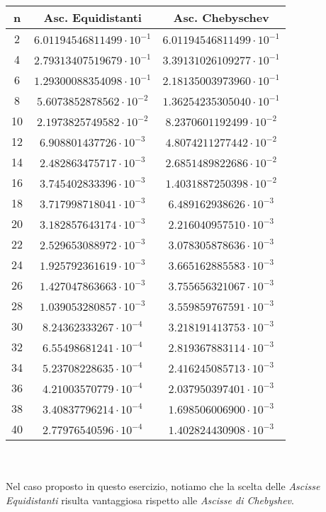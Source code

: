 \begin{tabular}{|c|c|c|}	%
	\hline
	n&Asc. Equidistanti&Asc. Chebyschev\\ \hline
	 2&$ 6.01194546811499 \cdot 10^{-1}   $&$ 6.01194546811499 \cdot 10^{-1} $\\ \hline
4&$ 2.79313407519679 \cdot 10^{-1}   $&$ 3.39131026109277 \cdot 10^{-1} $\\ \hline
6&$ 1.29300088354098 \cdot 10^{-1}   $&$ 2.18135003973960 \cdot 10^{-1} $\\ \hline
8&$ 5.6073852878562 \cdot 10^{-2}    $&$ 1.36254235305040 \cdot 10^{-1} $\\ \hline
10&$ 2.1973825749582 \cdot 10^{-2}    $&$ 8.2370601192499 \cdot 10^{-2} $\\ \hline
12&$ 6.908801437726 \cdot 10^{-3} $&$ 4.8074211277442 \cdot 10^{-2} $\\ \hline
14&$ 2.482863475717 \cdot 10^{-3} $&$ 2.6851489822686 \cdot 10^{-2} $\\ \hline
16&$ 3.745402833396 \cdot 10^{-3} $&$ 1.4031887250398 \cdot 10^{-2} $\\ \hline
18&$ 3.717998718041 \cdot 10^{-3} $&$ 6.489162938626 \cdot 10^{-3} $\\ \hline
20&$ 3.182857643174 \cdot 10^{-3} $&$ 2.216040957510 \cdot 10^{-3} $\\ \hline
22&$ 2.529653088972 \cdot 10^{-3} $&$ 3.078305878636 \cdot 10^{-3} $\\ \hline
24&$ 1.925792361619 \cdot 10^{-3} $&$ 3.665162885583 \cdot 10^{-3} $\\ \hline
26&$ 1.427047863663 \cdot 10^{-3} $&$ 3.755656321067 \cdot 10^{-3} $\\ \hline
28&$ 1.039053280857 \cdot 10^{-3} $&$ 3.559859767591 \cdot 10^{-3} $\\ \hline
30&$ 8.24362333267 \cdot 10^{-4} $&$ 3.218191413753 \cdot 10^{-3} $\\ \hline
32&$ 6.55498681241 \cdot 10^{-4} $&$ 2.819367883114 \cdot 10^{-3} $\\ \hline
34&$ 5.23708228635 \cdot 10^{-4} $&$ 2.416245085713 \cdot 10^{-3} $\\ \hline
36&$ 4.21003570779 \cdot 10^{-4} $&$ 2.037950397401 \cdot 10^{-3} $\\ \hline
38&$ 3.40837796214 \cdot 10^{-4} $&$ 1.698506006900 \cdot 10^{-3} $\\ \hline
40&$ 2.77976540596 \cdot 10^{-4} $&$ 1.402824430908 \cdot 10^{-3} $\\ \hline
\end{tabular}
\\ \\Nel caso proposto in questo esercizio, notiamo che la scelta delle \emph{Ascisse Equidistanti} risulta vantaggiosa rispetto alle \emph{Ascisse di Chebyshev}.
